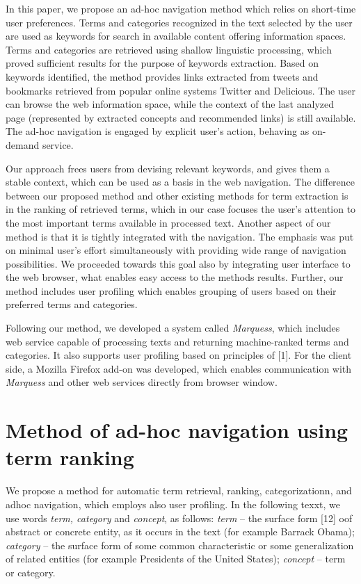 \documentclass{llncs}
\begin{document}
In this paper, we propose an ad-hoc navigation method which relies on short-time user preferences. Terms and categories recognized in the text selected by the user are used as keywords for search in available content offering information spaces. Terms and categories are retrieved using shallow linguistic processing, which proved sufficient results for the purpose of keywords extraction. Based on keywords identified, the method provides links extracted from tweets and bookmarks retrieved from popular online systems Twitter and Delicious. The user can browse the web information space, while the context of the last analyzed page (represented by extracted concepts and recommended links) is still available. The ad-hoc navigation is engaged by explicit user’s action, behaving as on-demand service. 

Our approach frees users from devising relevant keywords, and gives them a stable context, which can be used as a basis in the web navigation. The difference between our proposed method and other existing methods for term extraction is in the ranking of retrieved terms, which in our case focuses the user’s attention to the most important terms available in processed text. Another aspect of our method is that it is tightly integrated with the navigation. The emphasis was put on minimal user’s effort simultaneously with providing wide range of navigation possibilities. We proceeded towards this goal also by integrating user interface to the web browser, what enables easy access to the methods results. Further, our method includes user profiling which enables grouping of users based on their preferred terms and categories. 

Following our method, we developed a system called \textit{Marquess}, which includes web service capable of processing texts and returning machine-ranked terms and categories. It also supports user profiling based on principles of [1]. For the client side, a Mozilla Firefox add-on was developed, which enables communication with \textit{Marquess} and other web services directly from browser window. 



\section{Method of ad-hoc navigation using term ranking }

We propose a method for automatic term retrieval, ranking, categorizationn, and adhoc navigation, which employs also user profiling. In the following texxt, we use words  \textit{term, category} and \textit{concept}, as follows: 
\textit{term} – the surface form [12] oof abstract or concrete entity, as it occurs in the text (for example Barrack Obama); \textit{category} – the surface form of some common characteristic or some generalization of related entities (for example Presidents of the United States); \textit{concept} – term or category.  
\end{document}
